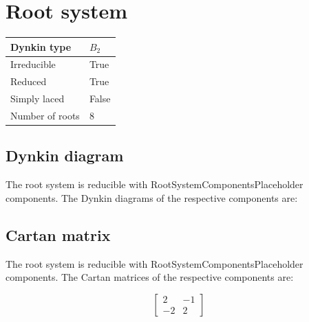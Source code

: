 \documentclass[11pt]{article}
\theoremstyle{definition}
\newif\ifrootsystemirreducible
\begin{document}
\newpage
\section{Root system}

\begin{tabular}{|l|l|}
	\hline
    Dynkin type & $B_2$ \\
	\hline
    Irreducible & True \\
	\hline
    Reduced & True \\
	\hline
	Simply laced & False \\
	\hline
	Number of roots & $8$ \\
	\hline
\end{tabular}

\subsection{Dynkin diagram}

\ifrootsystemirreducible
The root system is irreducible and has Dynkin diagram:
\else
The root system is reducible with RootSystemComponentsPlaceholder components. The Dynkin diagrams of the respective components are:
\fi

\begin{center}
\end{center}

\subsection{Cartan matrix}

\ifrootsystemirreducible
The root system is irreducible and has Cartan matrix:
\else
The root system is reducible with RootSystemComponentsPlaceholder components. The Cartan matrices of the respective components are:
\fi

\[
\left[\begin{matrix}2 & -1\\-2 & 2\end{matrix}\right]
\]
\end{document}
